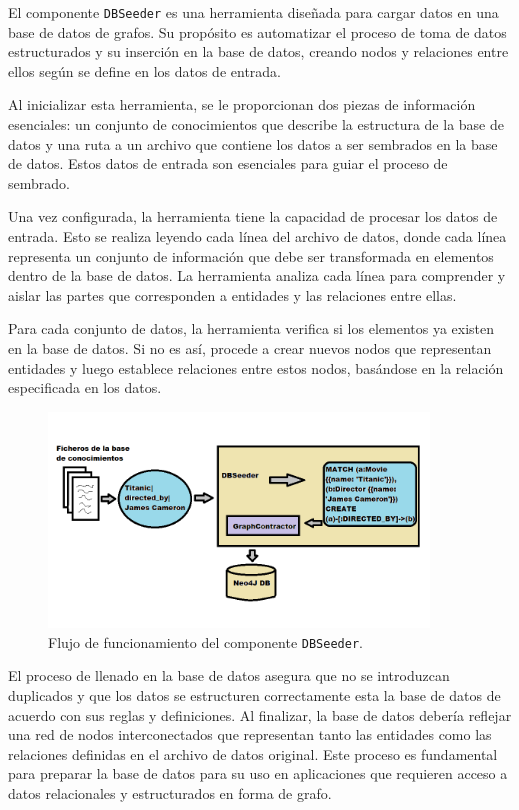 El componente \texttt{DBSeeder} es una herramienta diseñada para cargar datos en una base de datos de grafos. Su propósito es automatizar el proceso de toma de datos estructurados y su inserción en la base de datos, creando nodos y relaciones entre ellos según se define en los datos de entrada.

Al inicializar esta herramienta, se le proporcionan dos piezas de información esenciales: un conjunto de conocimientos que describe la estructura de la base de datos y una ruta a un archivo que contiene los datos a ser sembrados en la base de datos. Estos datos de entrada son esenciales para guiar el proceso de sembrado.

Una vez configurada, la herramienta tiene la capacidad de procesar los datos de entrada. Esto se realiza leyendo cada línea del archivo de datos, donde cada línea representa un conjunto de información que debe ser transformada en elementos dentro de la base de datos. La herramienta analiza cada línea para comprender y aislar las partes que corresponden a entidades y las relaciones entre ellas.

Para cada conjunto de datos, la herramienta verifica si los elementos ya existen en la base de datos. Si no es así, procede a crear nuevos nodos que representan entidades y luego establece relaciones entre estos nodos, basándose en la relación especificada en los datos.

\begin{figure}[H]\label{dbseeder}
	\centering
	\includegraphics[width = 0.9\textwidth]{./Graphics/dbseeder}
	\caption{Flujo de funcionamiento del componente \texttt{DBSeeder}.}
\end{figure}

El proceso de llenado en la base de datos asegura que no se introduzcan duplicados y que los datos se estructuren correctamente esta la base de datos de acuerdo con sus reglas y definiciones. Al finalizar, la base de datos debería reflejar una red de nodos interconectados que representan tanto las entidades como las relaciones definidas en el archivo de datos original. Este proceso es fundamental para preparar la base de datos para su uso en aplicaciones que requieren acceso a datos relacionales y estructurados en forma de grafo.

